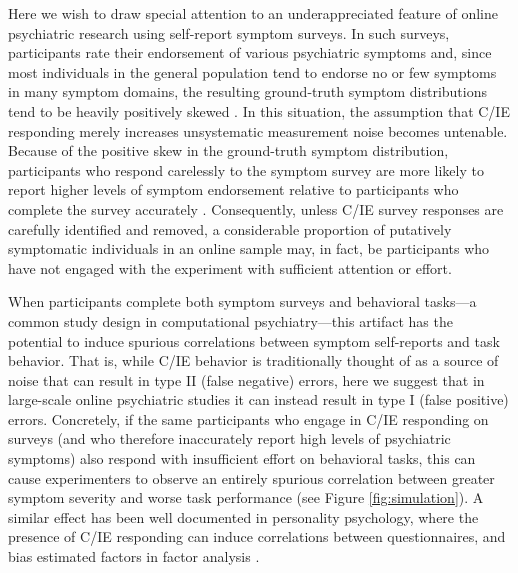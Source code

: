 \documentclass[a4paper,notitlepage,12pt]{article}
\begin{document}
\begin{refsection}[main]
Here we wish to draw special attention to an underappreciated feature of online psychiatric research using self-report symptom surveys. In such surveys, participants rate their endorsement of various psychiatric symptoms and, since most individuals in the general population tend to endorse no or few symptoms in many symptom domains, the resulting ground-truth symptom distributions tend to be heavily positively skewed \cite{lowe2008validation, tomitaka2018distributional}. In this situation, the assumption that C/IE responding merely increases unsystematic measurement noise becomes untenable. Because of the positive skew in the ground-truth symptom distribution, participants who respond carelessly to the symptom survey are more likely to report higher levels of symptom endorsement relative to participants who complete the survey accurately \cite{chandler2020participant, ophir2020turker, king2018random}. Consequently, unless C/IE survey responses are carefully identified and removed, a considerable proportion of putatively symptomatic individuals in an online sample may, in fact, be participants who have not engaged with the experiment with sufficient attention or effort.

When participants complete both symptom surveys and behavioral tasks---a common study design in computational psychiatry---this artifact has the potential to induce spurious correlations between symptom self-reports and task behavior. That is, while C/IE behavior is traditionally thought of as a source of noise that can result in type II (false negative) errors, here we suggest that in large-scale online psychiatric studies it can instead result in type I (false positive) errors. Concretely, if the same participants who engage in C/IE responding on surveys (and who therefore inaccurately report high levels of psychiatric symptoms) also respond with insufficient effort on behavioral tasks, this can cause experimenters to observe an entirely spurious correlation between greater symptom severity and worse task performance (see Figure \ref{fig:simulation}). A similar effect has been well documented in personality psychology, where the presence of C/IE responding can induce correlations between questionnaires, and bias estimated factors in factor analysis \cite{huang2012detecting, robinson2014inaccurate, huang2015insufficient, chandler2020participant, arias2020little}.


\end{refsection}
\end{document}
